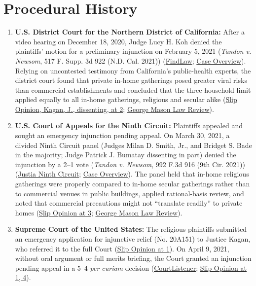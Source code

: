 \documentclass[12pt]{article}
\begin{document}
\section{Procedural History}
\begin{enumerate}
\item \textbf{U.S. District Court for the Northern District of California:} After a video hearing on December 18, 2020, Judge Lucy H. Koh denied the plaintiffs' motion for a preliminary injunction on February 5, 2021 (\textit{Tandon v. Newsom}, 517 F. Supp. 3d 922 (N.D. Cal. 2021)) (\href{https://caselaw.findlaw.com/court/us-dis-crt-n-d-cal-san-jos-div/2110794.html}{FindLaw}; \href{https://en.wikipedia.org/wiki/Tandon_v._Newsom}{Case Overview}). Relying on uncontested testimony from California's public-health experts, the district court found that private in-home gatherings posed greater viral risks than commercial establishments and concluded that the three-household limit applied equally to all in-home gatherings, religious and secular alike (\href{https://www.supremecourt.gov/opinions/20pdf/20a151_4g15.pdf}{Slip Opinion, Kagan, J., dissenting, at 2}; \href{https://lawreview.gmu.edu/print__issues/religious-and-secular-comparators/}{George Mason Law Review}).
\item \textbf{U.S. Court of Appeals for the Ninth Circuit:} Plaintiffs appealed and sought an emergency injunction pending appeal. On March 30, 2021, a divided Ninth Circuit panel (Judges Milan D. Smith, Jr., and Bridget S. Bade in the majority; Judge Patrick J. Bumatay dissenting in part) denied the injunction by a 2--1 vote (\textit{Tandon v. Newsom}, 992 F.3d 916 (9th Cir. 2021)) (\href{https://law.justia.com/cases/federal/appellate-courts/ca9/21-15228/21-15228-2021-03-30.html}{Justia Ninth Circuit}; \href{https://en.wikipedia.org/wiki/Tandon_v._Newsom}{Case Overview}). The panel held that in-home religious gatherings were properly compared to in-home secular gatherings rather than to commercial venues in public buildings, applied rational-basis review, and noted that commercial precautions might not ``translate readily'' to private homes (\href{https://www.supremecourt.gov/opinions/20pdf/20a151_4g15.pdf}{Slip Opinion at 3}; \href{https://lawreview.gmu.edu/print__issues/religious-and-secular-comparators/}{George Mason Law Review}).
\item \textbf{Supreme Court of the United States:} The religious plaintiffs submitted an emergency application for injunctive relief (No. 20A151) to Justice Kagan, who referred it to the full Court (\href{https://www.supremecourt.gov/opinions/20pdf/20a151_4g15.pdf}{Slip Opinion at 1}). On April 9, 2021, without oral argument or full merits briefing, the Court granted an injunction pending appeal in a 5--4 \textit{per curiam} decision (\href{https://www.courtlistener.com/opinion/4872486/tandon-v-newsom/}{CourtListener}; \href{https://www.supremecourt.gov/opinions/20pdf/20a151_4g15.pdf}{Slip Opinion at 1, 4}).

\end{enumerate}
\end{document}
